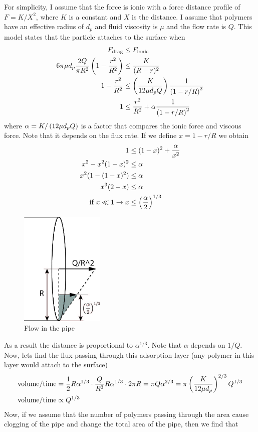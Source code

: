 For simplicity, I assume that the force is ionic with a force distance
profile of $F= K/X^2$, where $K$ is a constant and $X$ is the
distance. I assume that polymers have an effective radius of $d_{p}$
and fluid viscosity is $\mu$ and the flow rate is $Q$. This model
states that the particle attaches to the surface when
\begin{align}
    F_{\text{drag}} &\leq F_{\text{ionic}}\\
    6\pi \mu d_{p} \frac{2Q}{\pi R^2} \left( 1- \frac{r^2}{R^2} \right) & \leq \frac{K}{(R-r)^2} \\
    1 - \frac{r^2}{R^2} & \leq \left( \frac{K }{12 \mu  d_{p} Q} \right) \frac{1}{\left( 1 - r/R \right)^2} \\
    1 & \leq \frac{r^2}{R^2} + \alpha \frac{1}{\left( 1-r/R\right) ^2}
\end{align}
%
where $\alpha = K/\left( 12\mu d_pQ \right)$ is a factor that compares the ionic force and viscous
force. Note that it depends on the flux rate. If we define
$x = 1- r/R$ we obtain
%
\begin{align}
    1 &\leq (1-x)^{2} + \frac{\alpha}{x^2} \\
    x^2- x^2(1-x)^{2} &\leq \alpha \\
    x^2 (1- (1-x)^2) & \leq \alpha \\
    x^3(2-x) & \leq \alpha \\
    \text{if } x\ll1 \to x & \leq \left( \frac{\alpha}{2}\right)^{1/3}
\end{align}
%
%
\begin{figure}[H]
  \centering
  \includegraphics[width=4cm]{./Figs/model2.jpg}
  \caption{Flow in the pipe}
\end{figure}
%
As a result the distance is proportional to $\alpha^{1/3}$. Note that
$\alpha$ depends on $1/Q$.  Now, lets
find the flux passing through this adsorption layer (any polymer in
this layer would attach to the surface)
%
%
\begin{align}
  \text{volume}/\text{time} &= \frac{1}{2} R \alpha ^{1/3} \cdot \frac{Q}{R^{3}} R\alpha^{1/3} \cdot 2\pi R = \pi Q \alpha^{2/3}  = \pi \left( \frac{K  }{12 \mu  d_{p}} \right)^{2/3} Q^{1/3} \\
  \text{volume}/\text{time} & \propto {Q^{1/3}} 
\end{align}
%
Now, if we assume that the number of polymers passing through the area
cause clogging of the pipe and change the total area of the pipe, then
we find that

